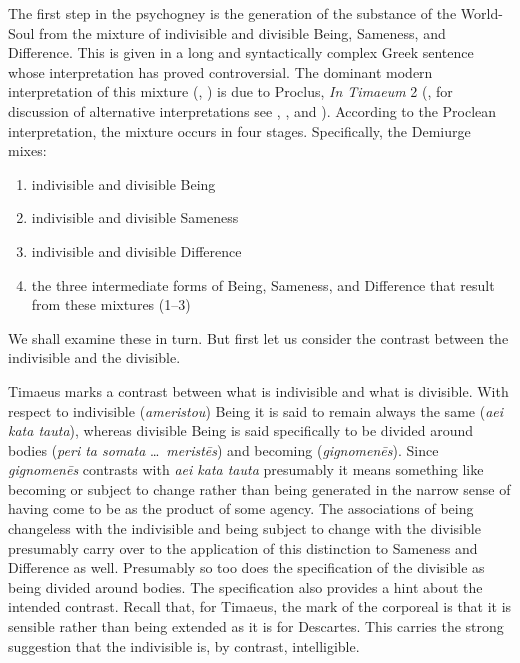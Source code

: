 The first step in the psychogney is the generation of the substance of the World-Soul from the mixture of indivisible and divisible Being, Sameness, and Difference. This is given in a long and syntactically complex Greek sentence whose interpretation has proved controversial. The dominant modern interpretation of this mixture (\citealt{Grube:1932qr}, \citealt[60--1]{Cornford:1935fk} \citealt[70--1]{Robinson:1970lq}) is due to Proclus, \emph{In Timaeum} 2 (\citealt{Diehl:1903re}, for discussion of alternative interpretations see \citealt[106--36]{Taylor:1928qb}, \citealt[51--54]{Shorey:1889sx}, and \citealt[352]{Shorey:1928ar}). According to the Proclean interpretation, the mixture occurs in four stages. Specifically, the Demiurge mixes:
\begin{enumerate}[(1)]
	\item indivisible and divisible Being
	\item indivisible and divisible Sameness
	\item indivisible and divisible Difference
	\item the three intermediate forms of Being, Sameness, and Difference that result from these mixtures (1--3)
\end{enumerate} 
We shall examine these in turn. But first let us consider the contrast between the indivisible and the divisible.

Timaeus marks a contrast between what is indivisible and what is divisible. With respect to indivisible (\emph{ameristou}) Being it is said to remain always the same (\emph{aei kata tauta}), whereas divisible Being is said specifically to be divided around bodies (\emph{peri ta somata} \ldots\ \emph{meristēs}) and becoming (\emph{gignomenēs}). Since \emph{gignomenēs} contrasts with \emph{aei kata tauta} presumably it means something like becoming or subject to change rather than being generated in the narrow sense of having come to be as the product of some agency. The associations of being changeless with the indivisible and being subject to change with the divisible presumably carry over to the application of this distinction to Sameness and Difference as well. Presumably so too does the specification of the divisible as being divided around bodies. The specification also provides a hint about the intended contrast. Recall that, for Timaeus, the mark of the corporeal is that it is sensible rather than being extended as it is for Descartes. This carries the strong suggestion that the indivisible is, by contrast, intelligible.

